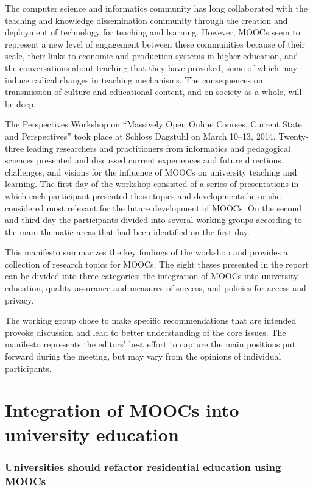 \documentclass[a4paper,UKenglish]{dagman}
\begin{document}
The computer science and informatics community has long collaborated with the teaching and knowledge
dissemination community through the creation and deployment of technology for teaching and learning.
However, MOOCs seem to represent a new level of engagement between these communities because of
their scale, their links to economic and production systems in higher education, and the
conversations about teaching that they have provoked, some of which may induce radical changes in
teaching mechanisms. The consequences on transmission of culture and educational content, and on
society as a whole, will be deep.

The Perspectives Workshop on ``Massively Open Online Courses, Current State and Perspectives'' took
place at Schloss Dagstuhl on March 10--13, 2014.  Twenty-three leading researchers and practitioners
from informatics and pedagogical sciences presented and discussed current experiences and future
directions, challenges, and visions for the influence of MOOCs on university teaching and learning.
The first day of the workshop consisted of a series of presentations in which each participant
presented those topics and developments he or she considered most relevant for the future
development of MOOCs. On the second and third day the participants divided into several working
groups according to the main thematic areas that had been identified on the first day.

This manifesto summarizes the key findings of the workshop and provides a collection of research
topics for MOOCs. The eight theses presented in the report can be divided into three categories: the
integration of MOOCs into university education, quality assurance and measures of success, and
policies for access and privacy.

The working group chose to make specific recommendations that are intended provoke discussion and
lead to better understanding of the core issues. The manifesto represents the editors' best effort
to capture the main positions put forward during the meeting, but may vary from the opinions of
individual participants.  


\section{Integration of MOOCs into university education}

\subsubsection*{Universities should refactor residential education using MOOCs}
\end{document}
